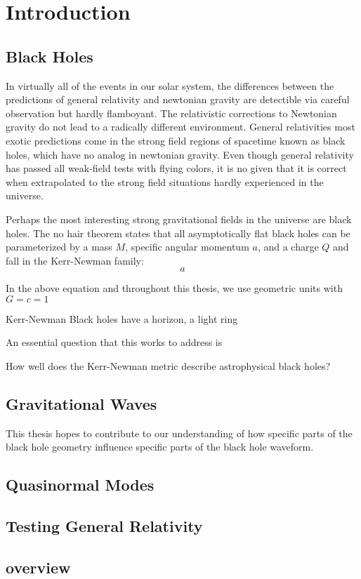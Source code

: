 \chapter{Introduction}
\label{chap:intro}

\begin{refsection}

\section{Black Holes}

In virtually all of the events in our solar system, the differences between the predictions of general relativity and newtonian gravity are detectible via careful observation but hardly flamboyant. The relativistic corrections to Newtonian gravity do not lead to a radically different environment. General relativities most exotic predictions come in the strong field regions of spacetime known as black holes, which have no analog in newtonian gravity. Even though general relativity has passed all weak-field tests with flying colors, it is no given that it is correct when extrapolated to the strong field situations hardly experienced in the universe.

Perhaps the most interesting strong gravitational fields in the universe are black holes. The no hair theorem states that all asymptotically flat black holes can be parameterized by a mass $M$, specific angular momentum $a$, and a charge $Q$ and fall in the Kerr-Newman family:
\begin{equation}
a
\end{equation}

In the above equation and throughout this thesis, we use geometric units with $G=c=1$

Kerr-Newman Black holes have a horizon, a light ring

An essential question that this works to address is 

How well does the Kerr-Newman metric describe astrophysical black holes?

\section{Gravitational Waves}

This thesis hopes to contribute to our understanding of how specific parts of the black hole geometry influence specific parts of the black hole waveform.

\section{Quasinormal Modes}

\section{Testing General Relativity}

\section{overview}








\printbibliography[heading=subbibliography]
\end{refsection}